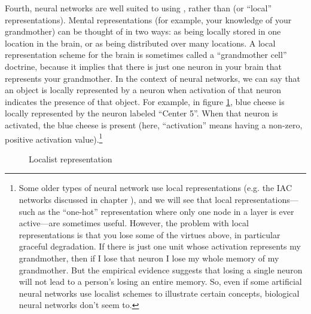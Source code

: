 Fourth, neural networks are well suited to using , rather than  (or ``local'' representations). Mental representations (for example, your knowledge of your grandmother) can be thought of in two ways: as being locally stored in one location in the brain, or as being distributed over many locations. A local representation scheme for the brain is sometimes called a ``grandmother cell'' doctrine, because it implies that there is just one neuron in your brain that represents your grandmother. In the context of neural networks, we can say that an object is locally represented by a neuron when activation of that neuron indicates the presence of that object. For example, in figure \ref{localist}, blue cheese is locally represented by the neuron labeled ``Center 5''. When that neuron is activated, the blue cheese is present (here, ``activation'' means having a non-zero, positive activation value).\footnote{Some older types of neural network use local representations (e.g. the IAC networks discussed in chapter ), and we will see that local representations---such as the ``one-hot'' representation where only one node in a layer is ever active---are sometimes useful. However, the problem with local representations is that you lose some of the virtues above, in particular graceful degradation. If there is just one unit whose activation represents my grandmother, then if I lose that neuron I lose my whole memory of my grandmother. But the empirical evidence suggests that losing a single neuron will not lead to a person's losing an entire memory. So, even if some artificial neural networks use localist schemes to illustrate certain concepts, biological neural networks don't seem to.}



\begin{figure}[h]
\centering
{}
\caption{Localist representation}
\label{localist}
\end{figure}

